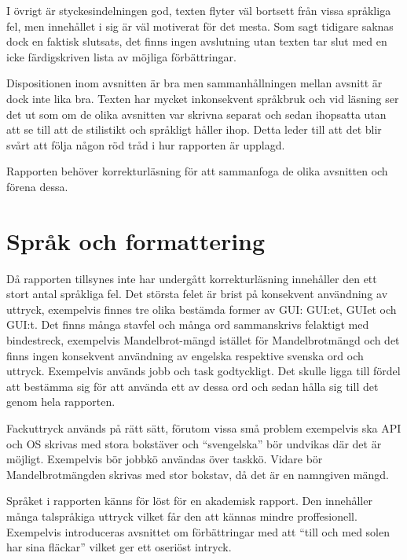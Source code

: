 \documentclass[a4paper]{article}
\begin{document}
I övrigt är styckesindelningen god, texten flyter väl bortsett från vissa språkliga fel, men innehållet i sig är väl motiverat för det mesta. Som sagt tidigare saknas dock en faktisk slutsats,
det finns ingen avslutning utan texten tar slut med en icke färdigskriven lista av möjliga förbättringar.

Dispositionen inom avsnitten är bra men sammanhållningen mellan avsnitt är dock inte lika bra. Texten har mycket inkonsekvent språkbruk och vid läsning ser det ut som om de olika avsnitten
var skrivna separat och sedan ihopsatta utan att se till att de stilistikt och språkligt håller ihop. Detta leder till att det blir svårt att följa någon röd tråd i hur rapporten är
upplagd.

Rapporten behöver korrekturläsning för att sammanfoga de olika avsnitten och förena dessa.

\section{Språk och formattering}
Då rapporten tillsynes inte har undergått korrekturläsning innehåller den ett stort antal språkliga fel. Det största felet är brist på konsekvent användning av uttryck, exempelvis finnes
tre olika bestämda former av GUI: GUI:et, GUIet och GUI:t. Det finns många stavfel och många ord sammanskrivs felaktigt med bindestreck, exempelvis Mandelbrot-mängd istället för Mandelbrotmängd
och det finns ingen konsekvent användning av engelska respektive svenska ord och uttryck. Exempelvis används jobb och task godtyckligt. Det skulle ligga till fördel att bestämma sig för att
använda ett av dessa ord och sedan hålla sig till det genom hela rapporten.

Fackuttryck används på rätt sätt, förutom vissa små problem exempelvis ska API och OS skrivas med stora bokstäver och ``svengelska'' bör undvikas där det är möjligt. Exempelvis bör jobbkö användas
över taskkö. Vidare bör Mandelbrotmängden skrivas med stor bokstav, då det är en namngiven mängd.

Språket i rapporten känns för löst för en akademisk rapport. Den innehåller många talspråkiga uttryck vilket får den att kännas mindre proffesionell. Exempelvis introduceras avsnittet om
förbättringar med att ``till och med solen har sina fläckar'' vilket ger ett oseriöst intryck.
\end{document}
